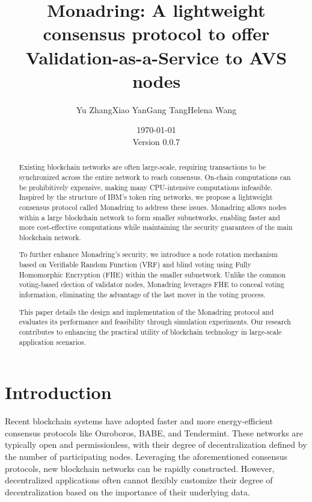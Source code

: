 \documentclass[11pt]{article}
\newcommand{\version}{\small Version 0.0.7}
\begin{document}
\title{Monadring: A lightweight consensus protocol to offer Validation-as-a-Service to AVS nodes}
\author{Yu Zhang\qquad Xiao Yan\qquad Gang Tang\qquad Helena Wang}
\date{\small \today\\\version}
\maketitle

\begin{abstract}

  
Existing blockchain networks are often large-scale, requiring transactions to be synchronized across the entire network to reach consensus. On-chain computations can be prohibitively expensive, making many CPU-intensive computations infeasible. Inspired by the structure of IBM’s token ring networks, we propose a lightweight consensus protocol called Monadring to address these issues. Monadring allows nodes within a large blockchain network to form smaller subnetworks, enabling faster and more cost-effective computations while maintaining the security guarantees of	the	main	blockchain	network.

To further enhance Monadring's security, we introduce a node rotation mechanism based on Verifiable Random Function (VRF) and blind voting using Fully Homomorphic Encryption (FHE) within the smaller subnetwork. Unlike the common voting-based election of validator nodes, Monadring leverages FHE to conceal voting information, eliminating the advantage of the  last  mover  in  the  voting  process.

This paper details the design and implementation of the Monadring protocol and evaluates its performance and feasibility through simulation experiments. Our research contributes to enhancing the practical utility of blockchain technology in large-scale application scenarios.



\end{abstract}

\section{Introduction}
Recent blockchain systems have adopted faster and more energy-efficient consensus protocols like Ouroboros\cite{cryptoeprint:2016/889}, BABE\cite{burdges2020overview}, and Tendermint\cite{buchman2016tendermint}. These networks are typically open and permissionless, with their degree of decentralization defined by the number of participating nodes. Leveraging the aforementioned consensus protocols, new blockchain networks can be rapidly constructed. However, decentralized applications often cannot flexibly customize their degree of decentralization based on the importance of their underlying data.
\end{document}
